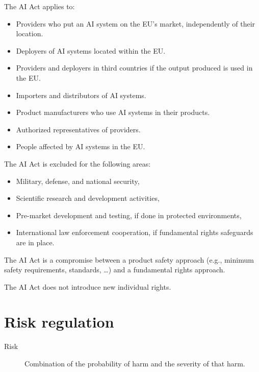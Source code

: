 The AI Act applies to:
\begin{itemize}
    \item Providers who put an AI system on the EU's market, independently of their location.
    \item Deployers of AI systems located within the EU.
    \item Providers and deployers in third countries if the output produced is used in the EU.
    \item Importers and distributors of AI systems.
    \item Product manufacturers who use AI systems in their products.
    \item Authorized representatives of providers.
    \item People affected by AI systems in the EU.
\end{itemize}

\begin{remark}
    The AI Act is excluded for the following areas:
    \begin{itemize}
        \item Military, defense, and national security,
        \item Scientific research and development activities,
        \item Pre-market development and testing, if done in protected environments,
        \item International law enforcement cooperation, if fundamental rights safeguards are in place.
    \end{itemize}
\end{remark}

\begin{remark}
    The AI Act is a compromise between a product safety approach (e.g., minimum safety requirements, standards, \dots) and a fundamental rights approach.
\end{remark}

\begin{remark}
    The AI Act does not introduce new individual rights.
\end{remark}



\section{Risk regulation}

\begin{description}
    \item[Risk]
        Combination of the probability of harm and the severity of that harm.
\end{description}


